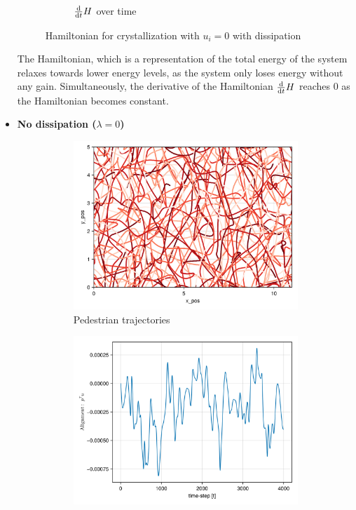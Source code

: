 \begin{itemize}
\begin{figure}[H]
\begin{subfigure}{.49\textwidth}
        \caption{$\frac{\mathrm d}{\mathrm d t} H$ over time}
        \label{plot:crys_dh}
    \end{subfigure}
    \caption{Hamiltonian for crystallization with $u_i =0$ with dissipation}
    \label{plot:crys_hamiltonian}
\end{figure}

The Hamiltonian, which is a representation of the total energy of the system relaxes towards lower energy levels, as the system only loses energy without any gain. Simultaneously, the derivative of the Hamiltonian $\frac{\mathrm d}{\mathrm d t} H$ reaches 0 as the Hamiltonian becomes constant.
\pagebreak

\item \textbf{No dissipation ($\lambda = 0$)}
\begin{figure}[H]
    \centering
    \begin{subfigure}{.49\textwidth}
        \centering
        \includegraphics[width=\linewidth]{figures/ch5_basic/traj_nodisp_4000.png}
        \caption{Pedestrian trajectories}
        \label{plot:nodisp_traj}
    \end{subfigure}
    \begin{subfigure}{.49\textwidth}
        \centering
        \includegraphics[width=\linewidth]{figures/ch5_basic/straight_nodisp.png}

\end{subfigure}
\end{figure}
\end{itemize}
